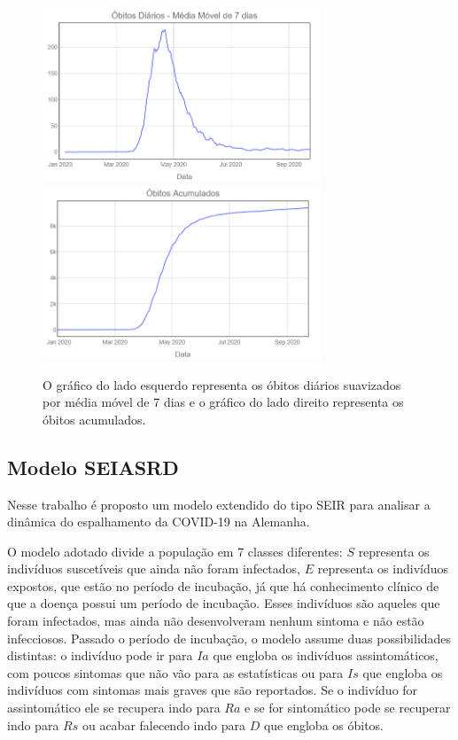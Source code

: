 \documentclass[12pt]{article}
\begin{document}
\begin{figure}[h]

\center
\subfigure
{\includegraphics[width=8.3cm]{obitos_diarios.png}}
\qquad
\subfigure
{\includegraphics[width=8.3cm]{obitos_acumulados.png}}
\caption{O gráfico do lado esquerdo representa os óbitos diários suavizados por média móvel de 7 dias e o gráfico do lado direito representa os óbitos acumulados.}

\end{figure}

\newpage
\subsection{Modelo SEIASRD}
Nesse trabalho é proposto um modelo extendido do tipo SEIR para analisar a dinâmica do espalhamento da COVID-19 na Alemanha.

O modelo adotado  divide a população em 7 classes diferentes: $S$ representa os indivíduos suscetíveis que ainda não foram infectados, $E$ representa os indivíduos expostos, que estão no período de incubação, já que há conhecimento clínico de que a doença possui um período de incubação. Esses indivíduos são aqueles que foram infectados, mas ainda não desenvolveram nenhum sintoma e não estão infecciosos. Passado o período de incubação,   o modelo assume duas possibilidades distintas: o indivíduo pode ir para $Ia$ que engloba os indivíduos assintomáticos, com poucos sintomas que não vão para as estatísticas ou para $Is$ que engloba os indivíduos com sintomas mais graves que são reportados. Se o indivíduo for assintomático ele se recupera indo para $Ra$ e se for sintomático pode se recuperar indo para $Rs$ ou acabar falecendo indo  para $D$ que engloba os óbitos.
\end{document}
